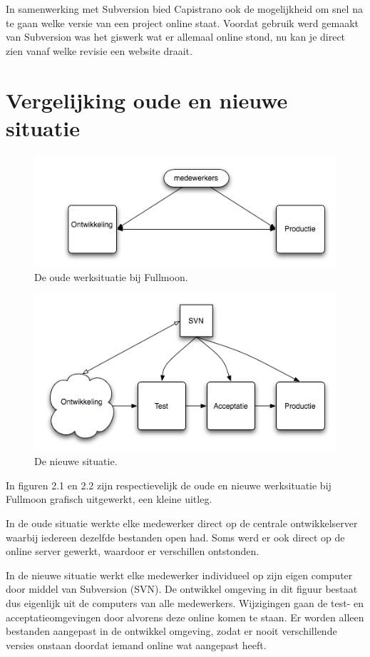 In samenwerking met Subversion bied Capistrano ook de mogelijkheid om snel na te gaan welke versie van een project online staat. Voordat gebruik werd gemaakt van Subversion was het giswerk wat er allemaal online stond, nu kan je direct zien vanaf welke revisie een website draait.

\section{Vergelijking oude en nieuwe situatie}

\begin{figure}
  \centering
  \includegraphics[scale=0.70]{situatie_oud.png}
  \caption[Oude situatie.]{De oude werksituatie bij Fullmoon.}
\end{figure}

\begin{figure}
  \centering
  \includegraphics[scale=0.70]{situatie_nieuw.png}
  \caption[Nieuwe situatie.]{De nieuwe situatie.}
\end{figure}

In figuren 2.1 en 2.2 zijn respectievelijk de oude en nieuwe werksituatie bij Fullmoon grafisch uitgewerkt, een kleine uitleg.

In de oude situatie werkte elke medewerker direct op de centrale ontwikkelserver waarbij iedereen dezelfde bestanden open had. Soms werd er ook direct op de online server gewerkt, waardoor er verschillen ontstonden.

In de nieuwe situatie werkt elke medewerker individueel op zijn eigen computer door middel van Subversion (SVN). De ontwikkel omgeving in dit figuur bestaat dus eigenlijk uit de computers van alle medewerkers. Wijzigingen gaan de test- en acceptatieomgevingen door alvorens deze online komen te staan. Er worden alleen bestanden aangepast in de ontwikkel omgeving, zodat er nooit verschillende versies onstaan doordat iemand online wat aangepast heeft.